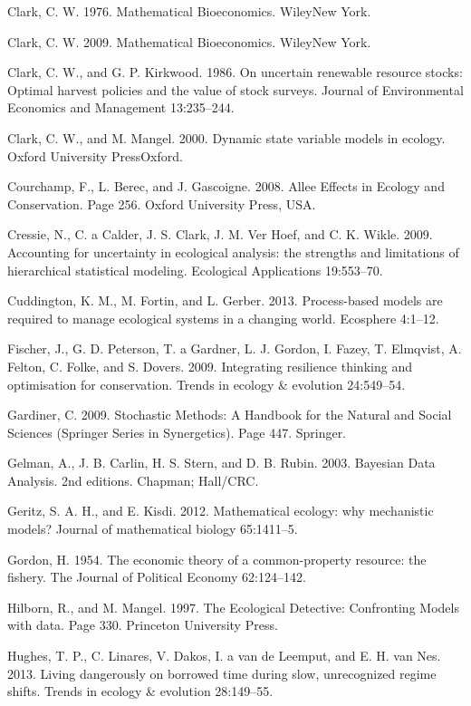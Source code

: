\documentclass[author-year, 12pt,review]{components/elsarticle} %
\begin{document}
Clark, C. W. 1976. Mathematical Bioeconomics. WileyNew York.

Clark, C. W. 2009. Mathematical Bioeconomics. WileyNew York.

Clark, C. W., and G. P. Kirkwood. 1986. On uncertain renewable resource
stocks: Optimal harvest policies and the value of stock surveys. Journal
of Environmental Economics and Management 13:235--244.

Clark, C. W., and M. Mangel. 2000. Dynamic state variable models in
ecology. Oxford University PressOxford.

Courchamp, F., L. Berec, and J. Gascoigne. 2008. Allee Effects in
Ecology and Conservation. Page 256. Oxford University Press, USA.

Cressie, N., C. a Calder, J. S. Clark, J. M. {Ver Hoef}, and C. K.
Wikle. 2009. Accounting for uncertainty in ecological analysis: the
strengths and limitations of hierarchical statistical modeling.
Ecological Applications 19:553--70.

Cuddington, K. M., M. Fortin, and L. Gerber. 2013. Process-based models
are required to manage ecological systems in a changing world. Ecosphere
4:1--12.

Fischer, J., G. D. Peterson, T. a Gardner, L. J. Gordon, I. Fazey, T.
Elmqvist, A. Felton, C. Folke, and S. Dovers. 2009. Integrating
resilience thinking and optimisation for conservation. Trends in ecology
\& evolution 24:549--54.

Gardiner, C. 2009. Stochastic Methods: A Handbook for the Natural and
Social Sciences (Springer Series in Synergetics). Page 447. Springer.

Gelman, A., J. B. Carlin, H. S. Stern, and D. B. Rubin. 2003. Bayesian
Data Analysis. 2nd editions. Chapman; Hall/CRC.

Geritz, S. A. H., and E. Kisdi. 2012. Mathematical ecology: why
mechanistic models? Journal of mathematical biology 65:1411--5.

Gordon, H. 1954. The economic theory of a common-property resource: the
fishery. The Journal of Political Economy 62:124--142.

Hilborn, R., and M. Mangel. 1997. The Ecological Detective: Confronting
Models with data. Page 330. Princeton University Press.

Hughes, T. P., C. Linares, V. Dakos, I. a van de Leemput, and E. H. van
Nes. 2013. Living dangerously on borrowed time during slow, unrecognized
regime shifts. Trends in ecology \& evolution 28:149--55.
\end{document}
